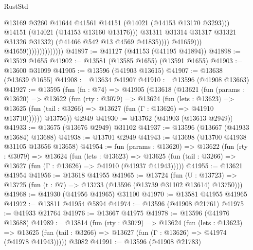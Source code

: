 \begin{lexlean}{RustStd}
\begin{coremodule}
                                                  @13169
                                                  @3260
                                                  @41644
                                                  @41561
                                                  @14151
                                                  (@14021 (@14153 @13170 @3293)))
                                                @14151
                                                (@14021 (@14153 @13160 @13176)))
                                              @31311
                                              @31314
                                              @31317
                                              @31321
                                              @31326
                                              @31332)
                                            (@41466 @542 @13 @4569 @41835))))
                                      @41659)))
                                @41659))))))))))))))
@41897 := @41127 (@41153 (@41195 @41894))
@41898 := @13579 @1655
@41902 := @13581 (@13585 @1655) (@13591 @1655)
@41903 := @13600 @31099
@41905 := @13596 (@41903 @13615)
@41907 := @13638 (@13639 @1655)
@41908 := @13634 @41907
@41910 := @13596 (@41908 @13663)
@41927 := @13595
    (fun (fn : @74) =>
    @41905
      (@13618
        (@13621
          (fun (params : @13620) =>
          @13622
            (fun (rty : @3079) =>
            @13624
              (fun (lets : @13623) =>
              @13625 (fun (tail : @3266) => @13627 (fun (Γ : @13626) => @41910 @13710))))))
        @13756))
    @2949
@41930 := @13762 (@41903 (@13613 @2949))
@41933 := @13675 (@13676 @2949) @31102
@41937 := @13596 (@13667 (@41933 @13684) @13688)
@41938 := @13701 @2949
@41943 := @13698 (@13700 @41938 @31105 @13656 @13658)
@41954 := fun (params : @13620) =>
  @13622
    (fun (rty : @3079) =>
    @13624
      (fun (lets : @13623) =>
      @13625 (fun (tail : @3266) => @13627 (fun (Γ : @13626) => @41910 (@41937 @41943)))))
@41955 := @13621 @41954
@41956 := @13618 @41955
@41965 := @13724
    (fun (U : @13723) => @13725 (fun (t : @7) => @13733 (@13596 (@13739 @31102 @13614) @13750)))
@41968 := @41930 (@41956 @41965) @31100
@41970 := @13581 @41955 @41965
@41972 := @13811 @41954 @5894
@41974 := @13596 (@41908 @21761)
@41975 := @41933 @21764
@41976 := @13667 @41975
@41978 := @13596 (@41976 @13688)
@41989 := @13814
    (fun (rty : @3079) =>
    @13624
      (fun (lets : @13623) =>
      @13625 (fun (tail : @3266) => @13627 (fun (Γ : @13626) => @41974 (@41978 @41943)))))
    @3082
@41991 := @13596 (@41908 @21783)

\end{coremodule}
\end{lexlean}
